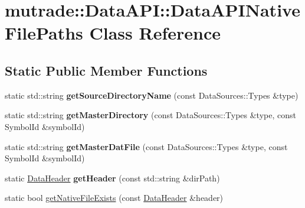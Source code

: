 \hypertarget{classmutrade_1_1_data_a_p_i_1_1_data_a_p_i_native_file_paths}{\section{mutrade\-:\-:Data\-A\-P\-I\-:\-:Data\-A\-P\-I\-Native\-File\-Paths Class Reference}
\label{classmutrade_1_1_data_a_p_i_1_1_data_a_p_i_native_file_paths}
}
\subsection*{Static Public Member Functions}
\begin{DoxyCompactItemize}
\item 
\hypertarget{classmutrade_1_1_data_a_p_i_1_1_data_a_p_i_native_file_paths_aa1090f148e65a5db82d610acfcdf921b}{static std\-::string {\bfseries get\-Source\-Directory\-Name} (const Data\-Sources\-::\-Types \&type)}\label{classmutrade_1_1_data_a_p_i_1_1_data_a_p_i_native_file_paths_aa1090f148e65a5db82d610acfcdf921b}

\item 
\hypertarget{classmutrade_1_1_data_a_p_i_1_1_data_a_p_i_native_file_paths_adc3d7e81cbd07e091757d1c4c80f3333}{static std\-::string {\bfseries get\-Master\-Directory} (const Data\-Sources\-::\-Types \&type, const Symbol\-Id \&symbol\-Id)}\label{classmutrade_1_1_data_a_p_i_1_1_data_a_p_i_native_file_paths_adc3d7e81cbd07e091757d1c4c80f3333}

\item 
\hypertarget{classmutrade_1_1_data_a_p_i_1_1_data_a_p_i_native_file_paths_ac0f7b3fed8fa8af0712c1f78490417ec}{static std\-::string {\bfseries get\-Master\-Dat\-File} (const Data\-Sources\-::\-Types \&type, const Symbol\-Id \&symbol\-Id)}\label{classmutrade_1_1_data_a_p_i_1_1_data_a_p_i_native_file_paths_ac0f7b3fed8fa8af0712c1f78490417ec}

\item 
\hypertarget{classmutrade_1_1_data_a_p_i_1_1_data_a_p_i_native_file_paths_a795e87dd29910e014ac23edf8237115f}{static \hyperlink{structmutrade_1_1_data_a_p_i_1_1_data_header}{Data\-Header} {\bfseries get\-Header} (const std\-::string \&dir\-Path)}\label{classmutrade_1_1_data_a_p_i_1_1_data_a_p_i_native_file_paths_a795e87dd29910e014ac23edf8237115f}

\item 
static bool \hyperlink{classmutrade_1_1_data_a_p_i_1_1_data_a_p_i_native_file_paths_a38343c2c8342b2808504319a82c7208f}{get\-Native\-File\-Exists} (const \hyperlink{structmutrade_1_1_data_a_p_i_1_1_data_header}{Data\-Header} \&header)
\end{DoxyCompactItemize}
